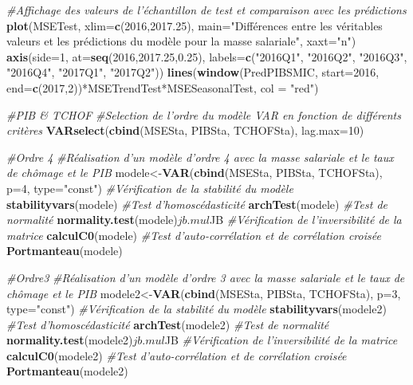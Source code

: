 \documentclass[11pt,]{article}
\newenvironment{Shaded}{\begin{snugshade}}{\end{snugshade}}
\newcommand{\KeywordTok}[1]{\textcolor[rgb]{0.13,0.29,0.53}{\textbf{{#1}}}}
\newcommand{\DataTypeTok}[1]{\textcolor[rgb]{0.13,0.29,0.53}{{#1}}}
\newcommand{\DecValTok}[1]{\textcolor[rgb]{0.00,0.00,0.81}{{#1}}}
\newcommand{\FloatTok}[1]{\textcolor[rgb]{0.00,0.00,0.81}{{#1}}}
\newcommand{\StringTok}[1]{\textcolor[rgb]{0.31,0.60,0.02}{{#1}}}
\newcommand{\CommentTok}[1]{\textcolor[rgb]{0.56,0.35,0.01}{\textit{{#1}}}}
\newcommand{\NormalTok}[1]{{#1}}
\begin{document}
\begin{Shaded}
\begin{Highlighting}[]
{\CommentTok{#Affichage des valeurs de l'échantillon de test et comparaison avec les prédictions}
\KeywordTok{plot}\NormalTok{(MSETest, }\DataTypeTok{xlim=}\KeywordTok{c}\NormalTok{(}\DecValTok{2016}\NormalTok{,}\FloatTok{2017.25}\NormalTok{), }\DataTypeTok{main=}\StringTok{"Différences entre les véritables}
\StringTok{     valeurs et les prédictions du modèle pour la masse salariale"}\NormalTok{, }\DataTypeTok{xaxt=}\StringTok{"n"}\NormalTok{)}
\KeywordTok{axis}\NormalTok{(}\DataTypeTok{side=}\DecValTok{1}\NormalTok{, }\DataTypeTok{at=}\KeywordTok{seq}\NormalTok{(}\DecValTok{2016}\NormalTok{,}\FloatTok{2017.25}\NormalTok{,}\FloatTok{0.25}\NormalTok{), }\DataTypeTok{labels=}\KeywordTok{c}\NormalTok{(}\StringTok{"2016Q1"}\NormalTok{, }\StringTok{"2016Q2"}\NormalTok{, }\StringTok{"2016Q3"}\NormalTok{, }\StringTok{"2016Q4"}\NormalTok{, }\StringTok{"2017Q1"}\NormalTok{, }\StringTok{"2017Q2"}\NormalTok{))}
\KeywordTok{lines}\NormalTok{(}\KeywordTok{window}\NormalTok{(PredPIBSMIC, }\DataTypeTok{start=}\DecValTok{2016}\NormalTok{, }\DataTypeTok{end=}\KeywordTok{c}\NormalTok{(}\DecValTok{2017}\NormalTok{,}\DecValTok{2}\NormalTok{))*MSETrendTest*MSESeasonalTest, }\DataTypeTok{col =} \StringTok{"red"}\NormalTok{)}

\CommentTok{#PIB & TCHOF}
\CommentTok{#Selection de l'ordre du modèle VAR en fonction de différents critères}
\KeywordTok{VARselect}\NormalTok{(}\KeywordTok{cbind}\NormalTok{(MSESta, PIBSta, TCHOFSta), }\DataTypeTok{lag.max=}\DecValTok{10}\NormalTok{)}

\CommentTok{#Ordre 4}
\CommentTok{#Réalisation d'un modèle d'ordre 4 avec la masse salariale et le taux de chômage et le PIB}
\NormalTok{modele<-}\KeywordTok{VAR}\NormalTok{(}\KeywordTok{cbind}\NormalTok{(MSESta, PIBSta, TCHOFSta), }\DataTypeTok{p=}\DecValTok{4}\NormalTok{, }\DataTypeTok{type=}\StringTok{"const"}\NormalTok{)}
\CommentTok{#Vérification de la stabilité du modèle}
\KeywordTok{stabilityvars}\NormalTok{(modele)}
\CommentTok{#Test d'homoscédasticité}
\KeywordTok{archTest}\NormalTok{(modele)}
\CommentTok{#Test de normalité}
\KeywordTok{normality.test}\NormalTok{(modele)$jb.mul$JB}
\CommentTok{#Vérification de l'inversibilité de la matrice}
\KeywordTok{calculC0}\NormalTok{(modele)}
\CommentTok{#Test d'auto-corrélation et de corrélation croisée}
\KeywordTok{Portmanteau}\NormalTok{(modele)}

\CommentTok{#Ordre3}
\CommentTok{#Réalisation d'un modèle d'ordre 3 avec la masse salariale et le taux de chômage et le PIB}
\NormalTok{modele2<-}\KeywordTok{VAR}\NormalTok{(}\KeywordTok{cbind}\NormalTok{(MSESta, PIBSta, TCHOFSta), }\DataTypeTok{p=}\DecValTok{3}\NormalTok{, }\DataTypeTok{type=}\StringTok{"const"}\NormalTok{)}
\CommentTok{#Vérification de la stabilité du modèle}
\KeywordTok{stabilityvars}\NormalTok{(modele2)}
\CommentTok{#Test d'homoscédasticité}
\KeywordTok{archTest}\NormalTok{(modele2)}
\CommentTok{#Test de normalité}
\KeywordTok{normality.test}\NormalTok{(modele2)$jb.mul$JB}
\CommentTok{#Vérification de l'inversibilité de la matrice}
\KeywordTok{calculC0}\NormalTok{(modele2)}
\CommentTok{#Test d'auto-corrélation et de corrélation croisée}
\KeywordTok{Portmanteau}\NormalTok{(modele2)}

}
\end{Highlighting}
\end{Shaded}
\end{document}
